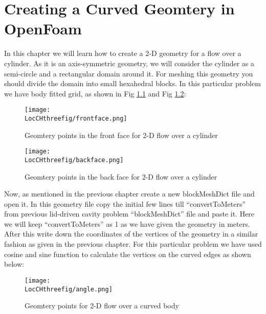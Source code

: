 \chapter{Creating a Curved Geomtery in OpenFoam}
\thispagestyle{empty}
\label{sec:chap3}
\newcommand{\LocCHthreefig}{\Origin/CHAPTERS/chap3/figures}


In this chapter we will learn how to create a 2-D geometry for a flow over a cylinder. As it is an axis-symmetric geometry, we will consider the cylinder as a semi-circle and a rectangular domain around it. For meshing this geometry you should divide the domain into small hexahedral blocks. In this particular problem we have body fitted grid, as shown in Fig \ref{frontface} and Fig \ref{backface}{$:$}

\begin{figure}[ht]  
\begin{center}  
\texttt{[image: \\LocCHthreefig/frontface.png]}
\caption{Geomtery points in the front face for 2-D flow over a cylinder}
\label{frontface}
\end{center}  
\end{figure}

\begin{figure}[ht]  
\begin{center}  
\texttt{[image: \\LocCHthreefig/backface.png]}
\caption{Geomtery points in the back face for 2-D flow over a cylinder}
\label{backface}
\end{center}  
\end{figure}

\flushleft Now, as mentioned in the previous chapter create a new blockMeshDict file and open it. In this geometry file  copy the initial few lines  till “convertToMeters” from previous lid-driven cavity problem “blockMeshDict” file and paste it. Here we will keep “convertToMeters” as 1 as we have given the geometry in meters. After this write down the coordinates of the vertices of the geometry in a similar fashion as given in the previous chapter. 
\flushleft For this particular problem we have used cosine and sine function to calculate the vertices on the curved edges as shown below{$:$}

\begin{figure}[ht]  
\begin{center}  
\texttt{[image: \\LocCHthreefig/angle.png]}
\caption{Geomtery points for 2-D flow over a curved body}
\label{angle}
\end{center}  
\end{figure}

